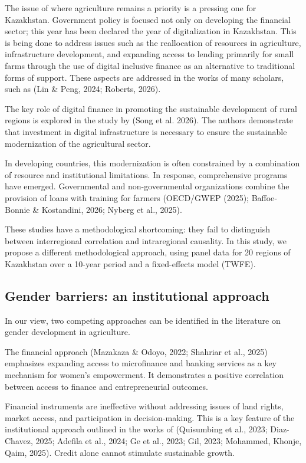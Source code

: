 ﻿\documentclass[sn-mathphys-num]{sn-jnl}
\newcommand{\hl}[1]{#1}
\begin{document}
The issue of where agriculture remains a priority is a pressing one for
Kazakhstan. Government policy is focused not only on developing the
financial sector; this year has been declared the year of digitalization
in Kazakhstan. This is being done to address issues such as the
reallocation of resources in agriculture, infrastructure development,
and expanding access to lending primarily for small farms through the
use of digital inclusive finance as an alternative to traditional forms
of support. These aspects are addressed in the works of many scholars,
such as (\hl{Lin \& Peng, 2024}; \hl{Roberts, 2026}).

The key role of digital finance in promoting the sustainable development
of rural regions is explored in the study \hl{by (Song et al. 2026}).
The authors demonstrate that investment in digital infrastructure is
necessary to ensure the sustainable modernization of the agricultural
sector.

In developing countries, this modernization is often constrained by a
combination of resource and institutional limitations. In response,
comprehensive programs have emerged. Governmental and non-governmental
organizations combine the provision of loans with training for farmers
(\hl{OECD/GWEP (2025); Baffoe‐Bonnie \& Kostandini, 2026; Nyberg et al.,
2025).}

These studies have a methodological shortcoming: they fail to
distinguish between interregional correlation and intraregional
causality. In this study, we propose a different methodological
approach, using panel data for 20 regions of Kazakhstan over a 10-year
period and a fixed-effects model (TWFE).

\subsection{Gender barriers: an institutional approach}

In our view, two competing approaches can be identified in the
literature on gender development in agriculture.

The financial approach (\hl{Mazakaza \& Odoyo, 2022}; \hl{Shahriar et
al., 2025}) emphasizes expanding access to microfinance and banking
services as a key mechanism for women's empowerment. It demonstrates a
positive correlation between access to finance and entrepreneurial
outcomes.

Financial instruments are ineffective without addressing issues of land
rights, market access, and participation in decision-making. This is a
key feature of the institutional approach outlined in the works of
(\hl{Quisumbing et al., 2023; Diaz-Chavez, 2025; Adefila et al., 2024;
Ge et al., 2023; Gil, 2023; Mohammed, Khonje, Qaim, 2025).} Credit alone
cannot stimulate sustainable growth.
\end{document}
